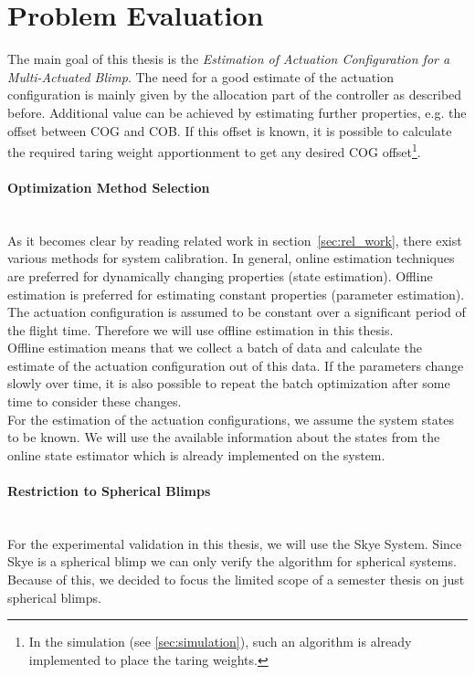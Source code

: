 \section{Problem Evaluation}
\label{sec:problem_evaluation}
The main goal of this thesis is the \textit{Estimation of Actuation Configuration for a Multi-Actuated Blimp}.
The need for a good estimate of the actuation configuration is mainly given by the allocation part of the controller as described before.
Additional value can be achieved by estimating further properties, e.g. the offset between COG and COB.
If this offset is known, it is possible to calculate the required taring weight apportionment to get any desired COG offset\footnote{
In the simulation (see \cref{sec:simulation}), such an algorithm is already implemented to place the taring weights.
}.

\paragraph{Optimization Method Selection} ~\\
As it becomes clear by reading related work in section~\ref{sec:rel_work}, there exist various methods for system calibration.
In general, online estimation techniques are preferred for dynamically changing properties (state estimation).
Offline estimation is preferred for estimating constant properties (parameter estimation).
The actuation configuration is assumed to be constant over a significant period of the flight time.
Therefore we will use offline estimation in this thesis.
\\

Offline estimation means that we collect a batch of data and calculate the estimate of the actuation configuration out of this data.
If the parameters change slowly over time, it is also possible to repeat the batch optimization after some time to consider these changes.
\\

For the estimation of the actuation configurations, we assume the system states to be known.
We will use the available information about the states from the online state estimator which is already implemented on the system.

\paragraph{Restriction to Spherical Blimps} ~\\
For the experimental validation in this thesis, we will use the Skye System.
Since Skye is a spherical blimp we can only verify the algorithm for spherical systems.
Because of this, we decided to focus the limited scope of a semester thesis on just spherical blimps.
\\

